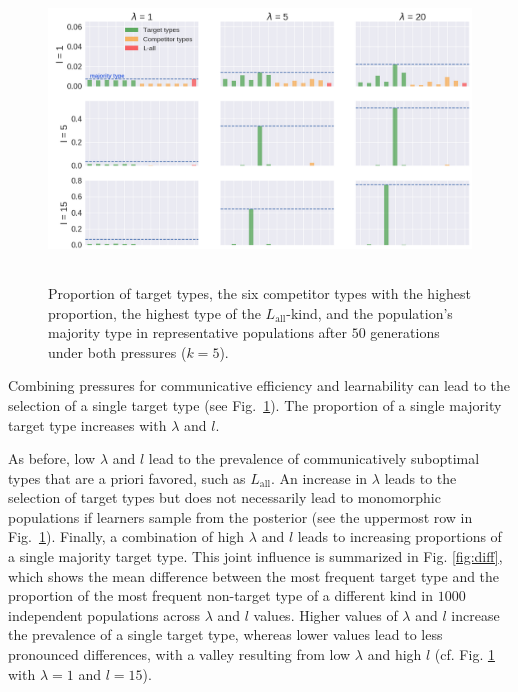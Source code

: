\documentclass[a4paper, 11pt]{article}
\theoremstyle{Satz}
\newcommand{\mylang}[1]{\ensuremath{L_{\text{#1}}}\xspace} %
\newcommand{\Lall}{\mylang{all}}
\begin{document}
\begin{figure}[t]
\centering
\includegraphics[width=1\textwidth,height=8cm,keepaspectratio]{./plots/alt-fig3-r+m}
\caption{Proportion of target types, the six competitor types with the highest proportion, the highest type of the $\Lall$-kind, and the population's majority type in representative populations after $50$ generations under both pressures ($k = 5$).}
\label{fig:rmd}
\end{figure}

Combining pressures for communicative efficiency and learnability can lead to the selection of
a single target type (see Fig.~\ref{fig:rmd}). The proportion of a single majority target type
increases with $\lambda$ and $l$.

As before, low $\lambda$ and $l$ lead to the prevalence of communicatively suboptimal types
that are a priori favored, such as $\Lall$. An increase in $\lambda$ leads to the selection of
target types but does not necessarily lead to monomorphic populations if learners sample from
the posterior (see the uppermost row in Fig.~\ref{fig:rmd}). Finally, a combination of high
$\lambda$ and $l$ leads to increasing proportions of a single majority target type. This joint
influence is summarized in Fig. \ref{fig:diff}, which shows the mean difference between the
most frequent target type and the proportion of the most frequent non-target type of a
different kind in $1000$ independent populations across $\lambda$ and $l$ values. Higher values
of $\lambda$ and $l$ increase the prevalence of a single target type, whereas lower values lead
to less pronounced differences, with a valley resulting from low $\lambda$ and high $l$
(cf. Fig. \ref{fig:rmd} with $\lambda = 1$ and $l=15$).
\end{document}
